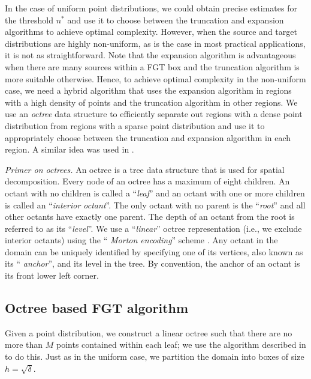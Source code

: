 
 In the case of uniform point distributions, we could obtain precise estimates for the threshold $n^*$ and use it to 
 choose between the truncation and expansion algorithms to achieve optimal complexity. However, when the source and 
 target distributions are highly non-uniform, as is the case in most practical applications, it is not as
 straightforward. Note that the expansion algorithm is advantageous when there are many sources within a FGT box and
 the truncation algorithm is more suitable otherwise. Hence, to achieve optimal complexity in the non-uniform case, we 
 need a hybrid algorithm that uses the expansion algorithm in regions with a high density of points and the 
 truncation algorithm in other regions. We use an {\em octree} \cite{clr90} data structure to efficiently
 separate out regions with a dense point distribution from regions with a sparse point distribution and use
 it to appropriately choose between the truncation and expansion algorithm in each region. A similar idea was
 used in \cite{veerapaneni08}. 
 
{\em Primer on octrees.} An octree is a tree data structure that is used for spatial decomposition. Every
node of an octree has a maximum of eight children. An octant with no children is
called a ``{\em leaf}'' and an octant with one or more children is
called an ``{\em interior octant}''. The only octant with no parent is the
 ``{\em root}'' and all other octants have exactly one parent. The depth of an octant 
 from the root is referred to as its ``{\em level}''. We use a ``{\em linear}'' octree
representation (i.e., we exclude interior octants) using the ``{\em
Morton encoding}'' scheme \cite{morton66}. Any octant in the domain can be uniquely
identified by specifying one of its vertices, also known as its ``{\em
anchor}'', and its level in the tree. By convention, the anchor of an
octant is its front lower left corner. 

\subsection{Octree based FGT algorithm}
\label{sc:octreefgt}

Given a point distribution, we construct a linear octree such that there are no more than $M$ points contained within each leaf; we
 use the algorithm described in \cite{octPaper08} to do this. Just as in the uniform case, we partition the
domain into boxes of size $h = \sqrt{\delta}$.


